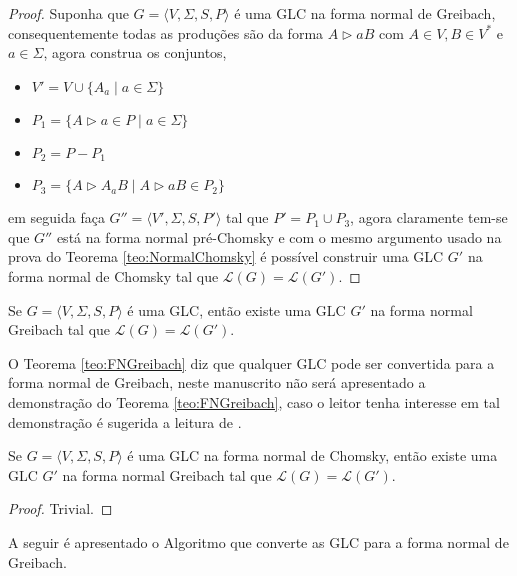 \begin{proof}
    Suponha que $G = \langle V, \Sigma, S, P \rangle$ é uma GLC na forma normal de Greibach, consequentemente todas as produções são da forma $A \rhd aB$ com $A \in V, B \in V^*$ e $a \in \Sigma$, agora construa os conjuntos, 
    \begin{itemize}
        \item $V' = V \cup \{A_a \mid a \in \Sigma\}$
        \item $P_1 = \{A \rhd a \in P \mid a \in \Sigma\}$
        \item $P_2 = P - P_1$
        \item $P_3 = \{A \rhd A_aB \mid A \rhd aB \in P_2\}$
    \end{itemize}
    em seguida faça $G'' = \langle V', \Sigma, S, P' \rangle$ tal que $P' = P_1 \cup P_3$, agora claramente tem-se que $G''$ está na forma normal pré-Chomsky e com o mesmo argumento usado na prova do Teorema \ref{teo:NormalChomsky} é possível construir uma GLC $G'$ na forma normal de Chomsky tal que $\mathcal{L}(G) = \mathcal{L}(G')$.
\end{proof}


\begin{theorem}\label{teo:FNGreibach}
    Se $G = \langle V, \Sigma, S, P \rangle$ é uma GLC, então existe uma GLC $G'$ na forma normal Greibach tal que $\mathcal{L}(G) = \mathcal{L}(G')$.
\end{theorem}

O Teorema \ref{teo:FNGreibach} diz que qualquer GLC pode ser convertida para a forma normal de Greibach, neste manuscrito não será apresentado a demonstração do Teorema \ref{teo:FNGreibach}, caso o leitor tenha interesse em tal demonstração é sugerida a leitura de \cite{andrzej1984, benjaLivro2010, greibach1965, menezes1998LFA}. 

\begin{corollary}
	Se $G = \langle V, \Sigma, S, P \rangle$ é uma GLC na forma normal de Chomsky, então existe uma GLC $G'$ na forma normal Greibach tal que $\mathcal{L}(G) = \mathcal{L}(G')$.
\end{corollary}

\begin{proof}
    Trivial.
\end{proof}

A seguir é apresentado o Algoritmo que converte as GLC para a forma normal de Greibach.

